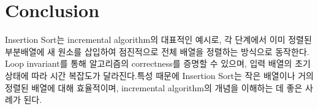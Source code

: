 \documentclass[
  korean,
]{article}
\begin{document}
\section{Conclusion}\label{conclusion}

Insertion Sort는 incremental algorithm의 대표적인 예시로, 각 단계에서
이미 정렬된 부분배열에 새 원소를 삽입하여 점진적으로 전체 배열을
정렬하는 방식으로 동작한다.\\
Loop invariant를 통해 알고리즘의 correctness를 증명할 수 있으며, 입력
배열의 초기 상태에 따라 시간 복잡도가 달라진다. 특성 때문에
Insertion Sort는 작은 배열이나 거의 정렬된 배열에 대해 효율적이며,
incremental algorithm의 개념을 이해하는 데 좋은 사례가 된다.
\end{document}
